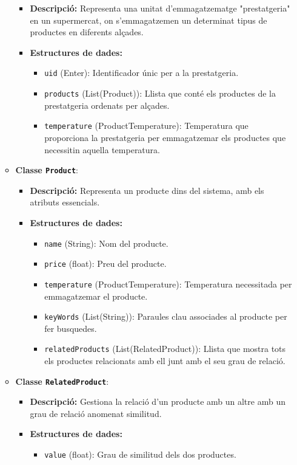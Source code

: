 \documentclass[a4paper,12pt]{report}
\begin{document}
\begin{itemize}
\begin{itemize}
\begin{itemize}
			\item \textbf{Descripció:} Representa una unitat d'emmagatzematge "prestatgeria" en un supermercat, on s'emmagatzemen un determinat tipus de productes en diferents alçades.
			\item \textbf{Estructures de dades:}
				\begin{itemize}
					\item \texttt{uid} (Enter): Identificador únic per a la prestatgeria.
					\item \texttt{products} (List(Product)): Llista que conté els productes de la prestatgeria ordenats per alçades.
					\item \texttt{temperature} (ProductTemperature): Temperatura que proporciona la prestatgeria per emmagatzemar els productes que necessitin aquella temperatura.
				\end{itemize}
		\end{itemize}
\item \textbf{Classe \texttt{Product}}:
		\begin{itemize}
			\item \textbf{Descripció:} Representa un producte dins del sistema, amb els atributs essencials.
			\item \textbf{Estructures de dades:}
				\begin{itemize}
					\item \texttt{name} (String): Nom del producte.
					\item \texttt{price} (float): Preu del producte.
					\item \texttt{temperature} (ProductTemperature): Temperatura necessitada per emmagatzemar el producte.
					\item \texttt{keyWords} (List(String)): Paraules clau associades al producte per fer busquedes.
					\item \texttt{relatedProducts} (List(RelatedProduct)): Llista que mostra tots els productes relacionats amb ell junt amb el seu grau de relació.
				\end{itemize}
		\end{itemize}
\item \textbf{Classe \texttt{RelatedProduct}}:
		\begin{itemize}
			\item \textbf{Descripció:} Gestiona la relació d'un producte amb un altre amb un grau de relació anomenat similitud.
			\item \textbf{Estructures de dades:}
				\begin{itemize}
					\item \texttt{value} (float): Grau de similitud dels dos productes.

\end{itemize}
\end{itemize}
\end{itemize}
\end{itemize}
\end{document}
